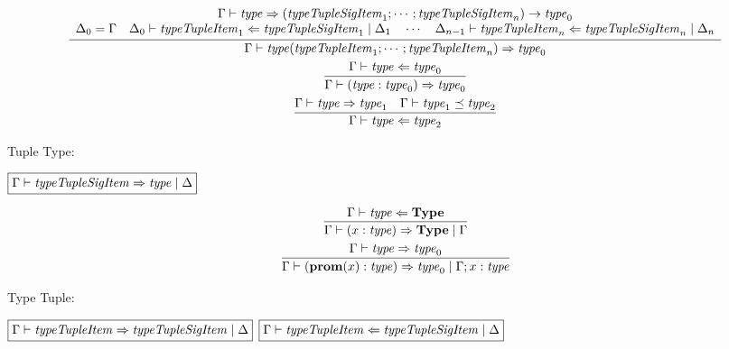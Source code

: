 \begin{gather*}
  \infer{\Gamma \vdash \mathit{type}(\mathit{typeTupleItem}_1; \cdots; \mathit{typeTupleItem}_n) \Rightarrow \mathit{type}_0}{
    \begin{array}{c}
      \Gamma \vdash \mathit{type} \Rightarrow (\mathit{typeTupleSigItem}_1; \cdots; \mathit{typeTupleSigItem}_n) \rightarrow \mathit{type}_0
      \\
      \Delta_0 = \Gamma
      \hspace{1em}
      \Delta_0 \vdash \mathit{typeTupleItem}_1 \Leftarrow \mathit{typeTupleSigItem}_1 \mid \Delta_1
      \hspace{1em}
      \cdots
      \hspace{1em}
      \Delta_{n - 1} \vdash \mathit{typeTupleItem}_n \Leftarrow \mathit{typeTupleSigItem}_n \mid \Delta_n
    \end{array}
  }
  \\
  \infer{\Gamma \vdash (\mathit{type}: \mathit{type}_0) \Rightarrow \mathit{type}_0}{
    \Gamma \vdash \mathit{type} \Leftarrow \mathit{type}_0
  }
  \\
  \infer{\Gamma \vdash \mathit{type} \Leftarrow \mathit{type}_2}{
    \Gamma \vdash \mathit{type} \Rightarrow \mathit{type}_1
    &
    \Gamma \vdash \mathit{type}_1 \preceq \mathit{type}_2
  }
\end{gather*}

Tuple Type:

$\fbox{$\Gamma \vdash \mathit{typeTupleSigItem} \Rightarrow \mathit{type} \mid \Delta$}$

\begin{gather*}
  \infer{\Gamma \vdash (x: \mathit{type}) \Rightarrow \mathbf{Type} \mid \Gamma}{
    \Gamma \vdash \mathit{type} \Leftarrow \mathbf{Type}
  }
  \\
  \infer{\Gamma \vdash (\mathbf{prom}(x): \mathit{type}) \Rightarrow \mathit{type}_0 \mid \Gamma; x: \mathit{type}}{
    \Gamma \vdash \mathit{type} \Rightarrow \mathit{type}_0
  }
\end{gather*}

Type Tuple:

$\fbox{$\Gamma \vdash \mathit{typeTupleItem} \Rightarrow \mathit{typeTupleSigItem} \mid \Delta$}$
$\fbox{$\Gamma \vdash \mathit{typeTupleItem} \Leftarrow \mathit{typeTupleSigItem} \mid \Delta$}$

